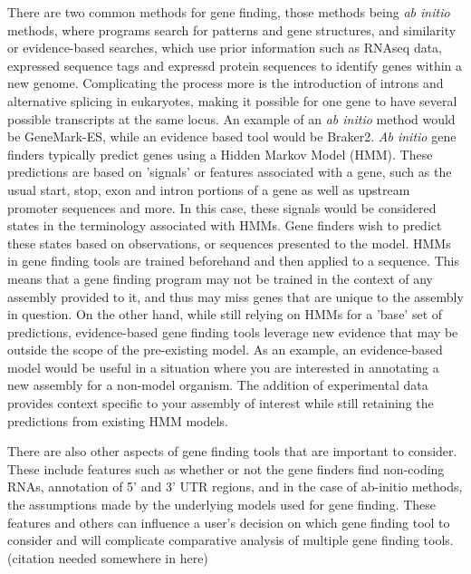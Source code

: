 There are two common methods for gene finding, those methods being
\textit{ab initio} methods, where programs search for patterns and
gene structures, and similarity or evidence-based searches, which use
prior information such as RNAseq data, expressed sequence tags and
expressd protein sequences to identify genes within a new
genome\cite{Ejigu2020}. Complicating the process more is the
introduction of introns and alternative splicing in eukaryotes, making
it possible for one gene to have several possible transcripts at the
same locus. An example of an \textit{ab initio} method would be
GeneMark-ES\cite{10.1093/nar/gki937}, while an evidence based tool
would be Braker2\cite{Bruna2021}.
\textit{Ab initio} gene finders typically predict genes using a Hidden
Markov Model (HMM)\cite{Ejigu2020}. These predictions are based on
'signals' or features associated with a gene, such as the usual start,
stop, exon and intron portions of a gene as well as upstream promoter
sequences and more. In this case, these signals would be considered
states in the terminology associated with HMMs. Gene finders wish to
predict these states based on observations, or sequences presented to
the model. HMMs in gene finding tools are trained beforehand and then
applied to a sequence. This means that a gene finding program may not
be trained in the context of any assembly provided to it, and thus may
miss genes that are unique to the assembly in question.
On the other hand, while still relying on HMMs for a 'base' set of
predictions, evidence-based gene finding tools leverage new evidence
that may be outside the scope of the pre-existing
model\cite{Keller2011}.  As an example, an evidence-based model would
be useful in a situation where you are interested in annotating a new
assembly for a non-model organism. The addition of experimental data
provides context specific to your assembly of interest while still
retaining the predictions from existing HMM models.

There are also other aspects of gene finding tools that are important
to consider. These include features such as whether or not the gene
finders find non-coding RNAs, annotation of 5' and 3' UTR regions, and
in the case of ab-initio methods, the assumptions made by the
underlying models used for gene finding. These features and others can
influence a user's decision on which gene finding tool to consider and
will complicate comparative analysis of multiple gene finding
tools. (citation needed somewhere in here)

